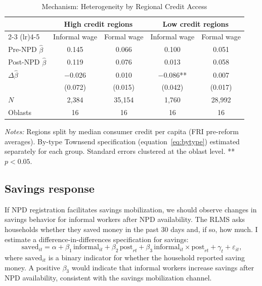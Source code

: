 \documentclass[12pt]{article}
\begin{document}
\begin{table}[htbp]
\centering
\caption{Mechanism: Heterogeneity by Regional Credit Access}
\label{tab:mech_banking}
\small
\begin{tabular}{lcccc}
\toprule
 & \multicolumn{2}{c}{High credit regions} & \multicolumn{2}{c}{Low credit regions} \\
 \cmidrule(lr){2-3} \cmidrule(lr){4-5}
 & Informal wage & Formal wage & Informal wage & Formal wage \\
\midrule
Pre-NPD $\hat{\beta}$ & 0.145 & 0.066 & 0.100 & 0.051 \\
Post-NPD $\hat{\beta}$ & 0.119 & 0.076 & 0.013 & 0.058 \\
$\Delta\hat{\beta}$ & $-$0.026 & 0.010 & $-$0.086** & 0.007 \\
 & (0.072) & (0.015) & (0.042) & (0.017) \\[4pt]
$N$ & 2,384 & 35,154 & 1,760 & 28,992 \\
Oblasts & 16 & 16 & 16 & 16 \\
\bottomrule
\end{tabular}
\begin{minipage}{0.9\textwidth}
\vspace{0.3em}
\footnotesize \textit{Notes:} Regions split by median consumer credit per capita (FRI pre-reform averages). By-type Townsend specification (equation~\ref{eq:bytype}) estimated separately for each group. Standard errors clustered at the oblast level. ** $p < 0.05$.
\end{minipage}
\end{table}

\subsection{Savings response}

If NPD registration facilitates savings mobilization, we should observe changes in savings behavior for informal workers after NPD availability. The RLMS asks households whether they saved money in the past 30 days and, if so, how much. I estimate a difference-in-differences specification for savings:
\begin{equation}\label{eq:savings}
\text{saved}_{it} = \alpha + \beta_1 \, \text{informal}_{it} + \beta_2 \, \text{post}_{rt} + \beta_3 \, \text{informal}_{it} \times \text{post}_{rt} + \gamma_t + \varepsilon_{it},
\end{equation}
where $\text{saved}_{it}$ is a binary indicator for whether the household reported saving money. A positive $\beta_3$ would indicate that informal workers increase savings after NPD availability, consistent with the savings mobilization channel.
\end{document}
